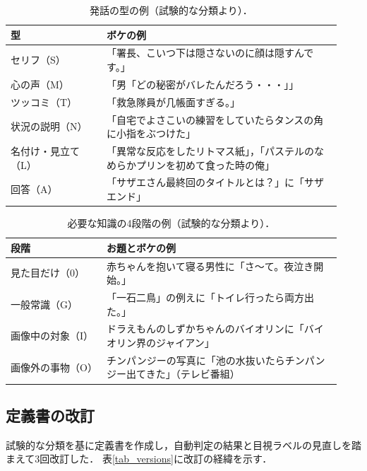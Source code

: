 \begin{table}[t]
    \centering
    \caption{発話の型の例（試験的な分類より）．}
    \label{tab_voice_examples}
    \footnotesize
    \begin{tabular}{@{}p{0.27\linewidth}p{0.66\linewidth}@{}}
        \toprule
        型 & ボケの例 \\
        \midrule
        セリフ（S） & 「署長、こいつ下は隠さないのに顔は隠すんです。」 \\
        心の声（M） & 「男「どの秘密がバレたんだろう・・・」」 \\
        ツッコミ（T） & 「救急隊員が几帳面すぎる。」 \\
        状況の説明（N） & 「自宅でよさこいの練習をしていたらタンスの角に小指をぶつけた」 \\
        名付け・見立て（L） & 「異常な反応をしたリトマス紙」，「パステルのなめらかプリンを初めて食った時の俺」 \\
        回答（A） & 「サザエさん最終回のタイトルとは？」に「サザエンド」 \\
        \bottomrule
    \end{tabular}
\end{table}

\begin{table}[t]
    \centering
    \caption{必要な知識の4段階の例（試験的な分類より）．}
    \label{tab_know_examples}
    \footnotesize
    \begin{tabular}{@{}p{0.27\linewidth}p{0.66\linewidth}@{}}
        \toprule
        段階 & お題とボケの例 \\
        \midrule
        見た目だけ（0） & 赤ちゃんを抱いて寝る男性に「さ〜て。夜泣き開始。」 \\
        一般常識（G） & 「一石二鳥」の例えに「トイレ行ったら両方出た。」 \\
        画像中の対象（I） & ドラえもんのしずかちゃんのバイオリンに「バイオリン界のジャイアン」 \\
        画像外の事物（O） & チンパンジーの写真に「池の水抜いたらチンパンジー出てきた」（テレビ番組） \\
        \bottomrule
    \end{tabular}
\end{table}

\subsection{定義書の改訂}
試験的な分類を基に定義書を作成し，自動判定の結果と目視ラベルの見直しを踏まえて3回改訂した．
表\ref{tab_versions}に改訂の経緯を示す．

